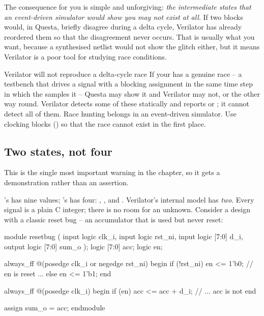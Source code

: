 The consequence for you is simple and unforgiving: \emph{the intermediate
states that an event-driven simulator would show you may not exist at all}. If
two  blocks would, in Questa, briefly disagree during a
delta cycle, Verilator has already reordered them so that the disagreement
never occurs. That is usually what you want, because a synthesised netlist
would not show the glitch either, but it means Verilator is a poor tool for
studying race conditions.

\begin{gotcha}{Verilator will not reproduce a delta-cycle race}
If your \SV{} has a genuine race -- a testbench that drives a signal with a
blocking assignment in the same time step in which the \DUT{} samples it --
Questa may show it and Verilator may not, or the other way round. Verilator
detects some of these statically and reports  or
; it cannot detect all of them. Race hunting belongs in an
event-driven simulator. Use clocking blocks () so that the race
cannot exist in the first place.
\end{gotcha}

\subsection{Two states, not four}
\label{sec:verilator:twostate}

This is the single most important
warning in the chapter, so it gets a demonstration rather than an assertion.

\VHDL{}'s  has nine values; \SV{}'s  has four:
, ,  and . Verilator's internal model has
\emph{two}. Every signal is a plain C integer; there is no room for an unknown.
Consider a design with a classic reset bug -- an accumulator that is used but
never reset:

\begin{svcode}[caption={A register that is used but never reset},label={lst:verilator:resetbug}]
module resetbug (
  input  logic       clk_i,
  input  logic       rst_ni,
  input  logic [7:0] d_i,
  output logic [7:0] sum_o
);
  logic [7:0] acc;
  logic       en;

  always_ff @(posedge clk_i or negedge rst_ni) begin
    if (!rst_ni) en <= 1'b0;      // en is reset ...
    else         en <= 1'b1;
  end

  always_ff @(posedge clk_i) begin
    if (en) acc <= acc + d_i;     // ... acc is not
  end

  assign sum_o = acc;
endmodule
\end{svcode}

